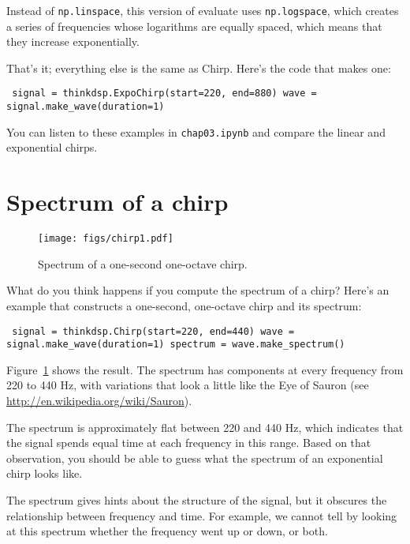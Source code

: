 \documentclass[12pt]{book} \usepackage[width=5.5in,height=8.5in, hmarginratio=3:2,vmarginratio=1:1]{geometry}
\begin{document}
Instead of {\tt np.linspace}, this version of evaluate uses {\tt np.logspace}, which creates a series of frequencies whose logarithms are equally spaced, which means that they increase exponentially. 

That's it; everything else is the same as Chirp. Here's the code that makes one: 

\begin{verbatim} signal = thinkdsp.ExpoChirp(start=220, end=880) wave = signal.make_wave(duration=1) \end{verbatim} 

You can listen to these examples in {\tt chap03.ipynb} and compare the linear and exponential chirps. 

\section{Spectrum of a chirp} \label{sauron} 

\begin{figure} 

\centerline{\texttt{[image: figs/chirp1.pdf]}} \caption{Spectrum of a one-second one-octave chirp.} \label{fig.chirp1} \end{figure} 

What do you think happens if you compute the spectrum of a chirp? Here's an example that constructs a one-second, one-octave chirp and its spectrum: 

\begin{verbatim} signal = thinkdsp.Chirp(start=220, end=440) wave = signal.make_wave(duration=1) spectrum = wave.make_spectrum() \end{verbatim} 

Figure~\ref{fig.chirp1} shows the result. The spectrum has components at every frequency from 220 to 440 Hz, with variations that look a little like the Eye of Sauron (see \url{http://en.wikipedia.org/wiki/Sauron}). 

The spectrum is approximately flat between 220 and 440 Hz, which indicates that the signal spends equal time at each frequency in this range. Based on that observation, you should be able to guess what the spectrum of an exponential chirp looks like. 

The spectrum gives hints about the structure of the signal, but it obscures the relationship between frequency and time. For example, we cannot tell by looking at this spectrum whether the frequency went up or down, or both. 
\end{document}
